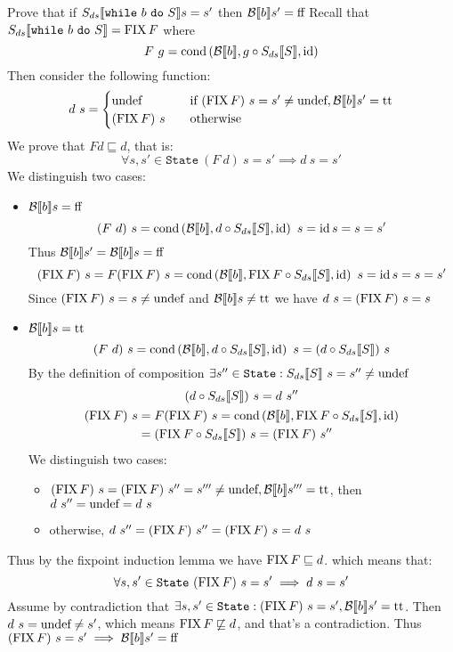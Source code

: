 \begin{exercise}{
    Prove that if $\Sds{\wwhile{b}{S}} s = s'$ then $\Bool{b} s' = \text{ff}$
}
    Recall that $\Sds{\wwhile{b}{S}} = \FIX F$ where 
    \[ F\ g= \cond{\Bool{b}}{g \circ \Sds{S}}{\id} \]
    Then consider the following function:
    \[
        d\ s = \begin{cases}
            \undef &\quad \text{if } (\FIX F)\ s = s' \neq \undef, \Bool{b} s' = \text{tt} \\
            (\FIX F)\ s &\quad \text{otherwise}
        \end{cases}
    \]
    We prove that $F d \sqsubseteq d$, that is:
    \[ \forall s, s' \in \texttt{State}\ (F\ d)\ s = s' \implies d\ s = s' \]
    We distinguish two cases:
    \begin{itemize}
        \item $\Bool{b} s = \text{ff}$
            \[ (F\ d)\ s = \cond{\Bool{b}}{d \circ \Sds{S}}{\id}\ s = \id s = s = s' \]
            Thus $\Bool{b} s' = \Bool{b} s = \text{ff}$
            \[ (\FIX F)\ s = F(\FIX F)\ s = \cond{\Bool{b}}{\FIX F \circ \Sds{S}}{\id}\ s = \id s = s = s' \]
            Since $(\FIX F)\ s = s \neq \undef$ and $\Bool{b} s \neq \text{tt}$ we have $d\ s = (\FIX F)\ s = s$
        \item $\Bool{b} s = \text{tt}$
            \[ (F\ d)\ s = \cond{\Bool{b}}{d \circ \Sds{S}}{\id}\ s = (d \circ \Sds{S})\ s \]
            By the definition of composition $\exists s'' \in \texttt{State} : \Sds{S}\ s = s'' \neq \undef$
            \begin{gather*}
                (d \circ \Sds{S})\ s = d\ s'' \\
                \begin{aligned}
                    (\FIX F)\ s &= F(\FIX F)\ s = \cond{\Bool{b}}{\FIX F \circ \Sds{S}}{\id} \\
                    &= (\FIX F \circ \Sds{S})\ s = (\FIX F)\ s''
                \end{aligned}
            \end{gather*}
            We distinguish two cases:
            \begin{itemize}
                \item $(\FIX F)\ s = (\FIX F)\ s'' = s''' \neq \undef, \Bool{b} s''' = \text{tt}$, then $d\ s'' = \undef = d\ s$
                \item otherwise, $d\ s'' = (\FIX F)\ s'' = (\FIX F)\ s = d\ s$
            \end{itemize}
    \end{itemize}
    Thus by the fixpoint induction lemma we have $\FIX F \sqsubseteq d$. which means that:
    \[ \forall s, s' \in \texttt{State}\ (\FIX F)\ s = s' \implies d\ s = s' \]
    Assume by contradiction that $\exists s, s' \in \texttt{State} : (\FIX F)\ s = s', \Bool{b} s' = \text{tt} $. Then $d\ s = \undef \neq s'$, which means $\FIX F \not\sqsubseteq d$, and that's a contradiction. Thus $(\FIX F)\ s = s' \implies \Bool{b} s' = \text{ff}$
\end{exercise}
